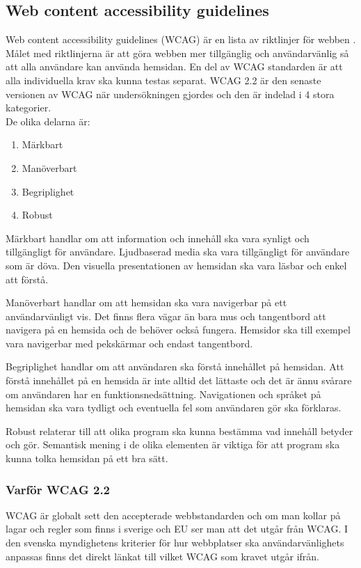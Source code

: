 \documentclass[11p]{article}
\begin{document}
    \subsection{Web content accessibility guidelines}
    Web content accessibility guidelines (WCAG) är en lista av riktlinjer för webben \parencite{WCAG_2.2}.
    Målet med riktlinjerna är att göra webben mer tillgänglig och användarvänlig så att alla användare kan använda hemsidan.
    En del av WCAG standarden är att alla individuella krav ska kunna testas separat.
    WCAG 2.2 är den senaste versionen av WCAG när undersökningen gjordes och den är indelad i 4 stora kategorier.
    \\De olika delarna är:
    \begin{enumerate}
        \item Märkbart
        \item Manöverbart
        \item Begriplighet
        \item Robust
    \end{enumerate}

    Märkbart handlar om att information och innehåll ska vara synligt och tillgängligt för användare.
    Ljudbaserad media ska vara tillgängligt för användare som är döva.
    Den visuella presentationen av hemsidan ska vara läsbar och enkel att förstå.

    Manöverbart handlar om att hemsidan ska vara navigerbar på ett användarvänligt vis.
    Det finns flera vägar än bara mus och tangentbord att navigera på en hemsida och de behöver också fungera.
    Hemsidor ska till exempel vara navigerbar med pekskärmar och endast tangentbord.

    Begriplighet handlar om att användaren ska förstå innehållet på hemsidan.
    Att förstå innehållet på en hemsida är inte alltid det lättaste och det är ännu svårare om användaren har en funktionsnedsättning.
    Navigationen och språket på hemsidan ska vara tydligt och eventuella fel som användaren gör ska förklaras.

    Robust relaterar till att olika program ska kunna bestämma vad innehåll betyder och gör.
    Semantisk mening i de olika elementen är viktiga för att program ska kunna tolka hemsidan på ett bra sätt.

    \subsubsection{Varför WCAG 2.2}
    WCAG är globalt sett den accepterade webbstandarden och om man kollar på lagar och regler som finns i sverige och EU ser man att det utgår från WCAG.
    I den svenska myndighetens kriterier för hur webbplatser ska användarvänlighets anpassas finns det direkt länkat till vilket WCAG som kravet utgår ifrån. \parencite{Utförande_av_Dos_lagen}
\end{document}

